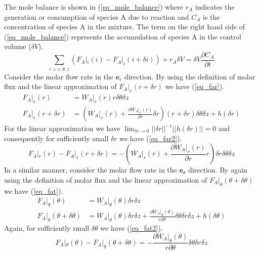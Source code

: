 \documentclass[11pt,fleqn]{article}
\theoremstyle{defstyle}
\begin{document}
The mole balance is shown in (\ref{eq_mole_balance}) where $r_A$ indicates the generation or consumption of species A due to reaction and $C_A$ is the concentration of species A in the mixture. The term on the right hand side of (\ref{eq_mole_balance}) represents the accumulation of species A in the control volume ($\delta V$).
\begin{equation}
\sum_{i=r, \theta, z}\left(F_A|_i(i) - F_A|_i(i+\delta i)\right) + r_A \delta V = \delta V \frac{\partial C_A}{\partial t}
\label{eq_mole_balance}
\end{equation}
Consider the molar flow rate in the $\mathbf{e}_r$ direction. By using the definition of molar flux and the linear approximation of $F_A|_r(r+\delta r)$ we have (\ref{eq_far}).
\begin{equation}
\begin{aligned}
F_A|_r(r) &= W_A|_r(r) r \delta \theta \delta z \\
F_A|_r(r+\delta r) &= \left(W_ A|_r(r) + \frac{\partial W_A|_r(r)}{\partial r} \delta r\right)(r+\delta r)\delta \theta \delta z + h(\delta r)
\end{aligned}
\label{eq_far}
\end{equation}
For the linear approximation we have $\lim_{\delta r \to 0} ||\delta r||^{-1}||h(\delta r)|| = 0 $ and consequently for sufficiently small $\delta r$ we have (\ref{eq_far2}).  
\begin{equation}
F_A|_r(r) - F_A|_r(r+\delta r)  = - \left(W_ A|_r(r)  + \frac{\partial W_A|_r(r)}{\partial r}r\right) \delta r \delta \theta \delta z
\label{eq_far2}
\end{equation}
In a similar manner, consider the molar flow rate in the $\mathbf{e}_\theta$ direction. By again using the definition of molar flux and the linear approximation of $F_A|_\theta(\theta+\delta \theta)$ we have (\ref{eq_fat}).
\begin{equation}
\begin{aligned}
F_A|_\theta(\theta) &= W_A|_\theta(\theta) \delta r \delta z \\
F_A|_\theta(\theta + \delta \theta) &= W_A|_\theta(\theta) \delta r \delta z + \frac{\partial W_A|_\theta(\theta)}{r \partial \theta}\delta \theta\delta r \delta z + h(\delta \theta)
\end{aligned}
\label{eq_fat}
\end{equation}
Again, for sufficiently small $\delta \theta$ we have (\ref{eq_fat2}).
\begin{equation}
F_A|_\theta(\theta) - F_A|_\theta(\theta + \delta \theta) =- \frac{\partial W_A|_\theta(\theta)}{r \partial \theta}\delta \theta\delta r \delta z
\label{eq_fat2} 
\end{equation}
\end{document}

